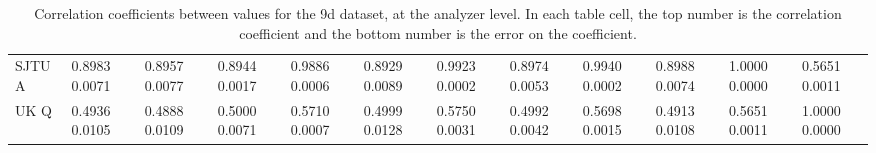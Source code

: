 \begin{landscape}
\begin{table}
\begin{tabularx}{1\linewidth}{@{\extracolsep{\fill}}lXXXXXXXXXXX}
	SJTU A & 0.8983 0.0071 & 0.8957 0.0077 & 0.8944 0.0017 & 0.9886 0.0006 & 0.8929 0.0089 & 0.9923 0.0002 & 0.8974 0.0053 & 0.9940 0.0002 & 0.8988 0.0074 & 1.0000 0.0000 & 0.5651 0.0011  \\
	UK Q   & 0.4936 0.0105 & 0.4888 0.0109 & 0.5000 0.0071 & 0.5710 0.0007 & 0.4999 0.0128 & 0.5750 0.0031 & 0.4992 0.0042 & 0.5698 0.0015 & 0.4913 0.0108 & 0.5651 0.0011 & 1.0000 0.0000  \\
  \bottomrule
\end{tabularx}
\caption[]{Correlation coefficients between \R values for the 9d dataset, at the analyzer level. In each table cell, the top number is the correlation coefficient and the bottom number is the error on the coefficient.}
\label{tab:Corrs_9d_analyzer}
\end{table}
\end{landscape}


